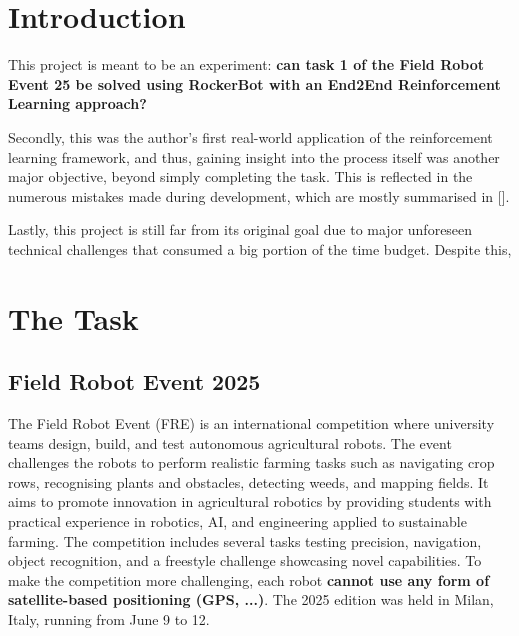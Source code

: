 \documentclass[11pt,a4paper,twocolumn]{article}
\begin{document}




\section{Introduction}
\label{sec:introduction}

This project is meant to be an experiment: \textbf{can task 1 of the Field Robot Event 25 be solved using RockerBot with an End2End Reinforcement Learning approach?} 

Secondly, this was the author's first real-world application of the reinforcement learning framework, and thus, gaining insight into the process itself was another major objective, beyond simply completing the task. This is reflected in the numerous mistakes made during development, which are mostly summarised in [].

Lastly, this project is still far from its original goal due to major unforeseen technical challenges that consumed a big portion of the time budget. Despite this, 

\section{The Task}
\label{sec:task}

\subsection{Field Robot Event 2025}
The Field Robot Event (FRE) is an international competition where university teams design, build, and test autonomous agricultural robots. The event challenges the robots to perform realistic farming tasks such as navigating crop rows, recognising plants and obstacles, detecting weeds, and mapping fields. It aims to promote innovation in agricultural robotics by providing students with practical experience in robotics, AI, and engineering applied to sustainable farming. The competition includes several tasks testing precision, navigation, object recognition, and a freestyle challenge showcasing novel capabilities.
To make the competition more challenging, each robot \textbf{cannot use any form of satellite-based positioning (GPS, ...)}.
The 2025 edition was held in Milan, Italy, running from June 9 to 12.
\end{document}
